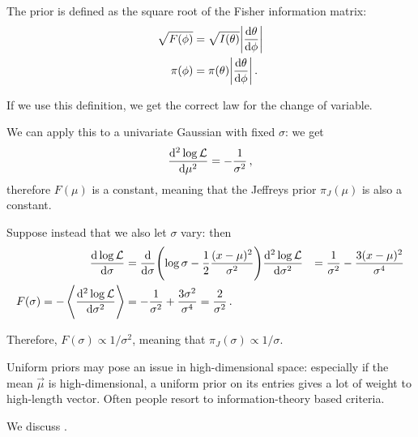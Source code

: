 \documentclass[main.tex]{subfiles}
\begin{document}
The prior is defined as the square root of the Fisher information matrix: 
%
\begin{align}
\sqrt{F(\phi )} &= \sqrt{I(\theta )} \abs{\dv{\theta }{\phi }}  \\
\pi (\phi ) &= \pi (\theta ) \abs{\dv{\theta }{\phi }}
\,.
\end{align}

If we use this definition, we get the correct law for the change of variable.

We can apply this to a univariate Gaussian with fixed \(\sigma \): we get 
%
\begin{align}
\dv[2]{\log \mathcal{L}}{\mu } = - \frac{1}{\sigma^2}
\,,
\end{align}
%
therefore \(F(\mu )\) is a constant, meaning that the Jeffreys prior \(\pi_J (\mu )\) is also a constant.

Suppose instead that we also let \(\sigma \) vary: then 
%
\begin{align}
\dv{\log \mathcal{L}}{\sigma } &= \dv{}{\sigma } \qty( \log \sigma - \frac{1}{2} \frac{(x - \mu )^2}{\sigma^2})
\dv[2]{\log \mathcal{L}}{\sigma } &= \frac{1}{\sigma^2} - \frac{3 (x - \mu )^2}{\sigma^{4}}  \\
F(\sigma ) = -\expval{\dv[2]{\log \mathcal{L}}{\sigma }} &= - \frac{1}{\sigma^2} + \frac{3 \sigma^2}{\sigma^{4}} = \frac{2}{\sigma^2}
\,.
\end{align}

Therefore, \(F(\sigma ) \propto 1 / \sigma^2\), meaning that \(\pi_J (\sigma ) \propto 1/ \sigma \).

Uniform priors may pose an issue in high-dimensional space: especially if the mean \(\vec{\mu} \) is high-dimensional, a uniform prior on its entries gives a lot of weight to high-length vector.
Often people resort to information-theory based criteria. 

We discuss \textcite[]{lahavBayesianHyperparametersApproach2000}.
\end{document}
